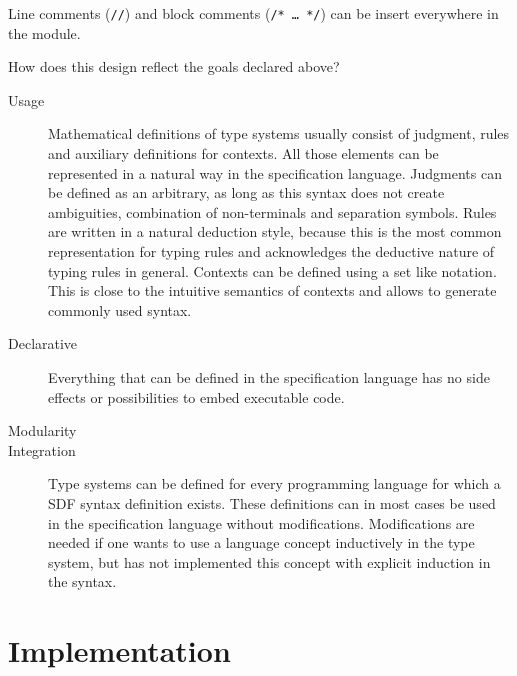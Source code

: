 Line comments (\verb|//|) and block comments (\verb|/* … */|) can be
insert everywhere in the module.

How does this design reflect the goals declared above?

\begin{description}
\item[Usage] Mathematical definitions of type systems usually consist
  of judgment, rules and auxiliary definitions for contexts. All
  those elements can be represented in a natural way in the
  specification language. Judgments can be defined as an arbitrary, as long
  as this syntax does not create ambiguities, combination of
  non-terminals and separation symbols. Rules are written in a natural
  deduction style, because this is the most common representation for
  typing rules and acknowledges the deductive nature of typing rules
  in general. Contexts can be defined using a set like
  notation. This is close to the intuitive semantics of contexts
  and allows to generate commonly used syntax.
\item[Declarative] Everything that can be defined in the specification
  language has no side effects or possibilities to embed executable
  code.
\item[Modularity] 
\item[Integration] Type systems can be defined for every programming
  language for which a SDF syntax definition exists. These definitions
  can in most cases be used in the specification language without
  modifications. Modifications are needed if one wants to use a
  language concept inductively in the type system, but has not
  implemented this concept with explicit induction in the
  syntax.
\end{description}
\section{Implementation}
\label{sec:generate-sdf}

